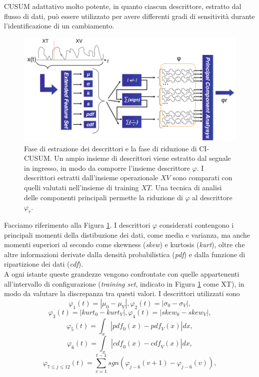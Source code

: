 CUSUM adattativo molto potente, in
quanto ciascun descrittore, estratto
dal flusso di dati, pu\`o essere
utilizzato per avere differenti gradi
di sensitivit\`a durante
l'identificazione di un cambiamento.
\begin{figure}
	\centering
	\includegraphics[width=12cm,keepaspectratio]{pictures/CI-CUSUM}
	\caption[Estrazione dei descrittori
		nel metodo CI-CUSUM]{Fase di estrazione dei descrittori e la fase di riduzione di CI-CUSUM. Un ampio insieme di descrittori viene estratto dal segnale in ingresso, in modo da comporre l'insieme descrittore $\varphi$. I descrittori estratti dall'insieme operazionale $XV$ sono comparati con quelli valutati nell'insieme di training $XT$. Una tecnica di analisi delle componenti principali permette la riduzione di $\varphi$ al descrittore $\varphi_r$.}
	\label{fig:CI-CUSUM}
\end{figure}
Facciamo riferimento alla Figura \ref{fig:CI-CUSUM}. I descrittori $\varphi$ considerati contengono i principali momenti della distibuzione dei dati, come media e varianza, ma anche momenti superiori al secondo come skewness (\textit{skew}) e kurtosis (\textit{kurt}), oltre che altre informazioni derivate dalla densit\`a probabilistica (\textit{pdf}) e dalla funzione di ripartizione dei dati (\textit{cdf}).\\
A ogni istante queste grandezze
vengono confrontate con quelle
appartenenti all'intervallo di
configurazione (\textit{training set},
indicato in Figura \ref{fig:CI-CUSUM}
come XT), in modo da valutare la
discrepanza tra questi valori. I
descrittori utilizzati sono
\[
\varphi_1(t)=|\mu_0-\mu_V|,\varphi_2(t)=|\sigma_0-\sigma_V|,\]
\[\varphi_3(t)=|\textit{kurt}_0-\textit{kurt}_V|,\varphi_4(t)=|\textit{skew}_0-\textit{skew}_V|, \]
\[\varphi_5(t)=\int_x|\textit{pdf}_0(x)-\textit{pdf}_V(x)|\textit{dx},\]
\[\varphi_6(t)=\int_x|\textit{cdf}_0(x)-\textit{cdf}_V(x)|\textit{dx}, \]
\[ \varphi_{7\leq j\leq 12}(t)=
\sum_{v=1}^{t-1}\textit{sgn}(\varphi_{j-6}(v+1)-\varphi_{j-6}(v)),\]
